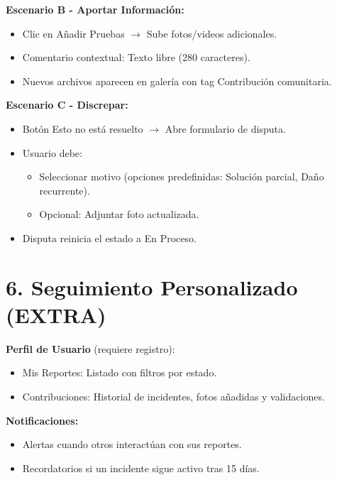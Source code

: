 \begin{multicols}{2}
\textbf{Escenario B - Aportar Información:}
\begin{itemize}
    \item Clic en Añadir Pruebas $\rightarrow$ Sube fotos/videos adicionales.
    \item Comentario contextual: Texto libre (280 caracteres).
    \item Nuevos archivos aparecen en galería con tag Contribución comunitaria.
\end{itemize}

\textbf{Escenario C - Discrepar:}
\begin{itemize}
    \item Botón Esto no está resuelto $\rightarrow$ Abre formulario de disputa.
    \item Usuario debe:
    \begin{itemize}
        \item Seleccionar motivo (opciones predefinidas: Solución parcial, Daño recurrente).
        \item Opcional: Adjuntar foto actualizada.
    \end{itemize}
    \item Disputa reinicia el estado a En Proceso.
\end{itemize}

\section*{6. Seguimiento Personalizado (EXTRA)}

\textbf{Perfil de Usuario} (requiere registro):
\begin{itemize}
    \item Mis Reportes: Listado con filtros por estado.
    \item Contribuciones: Historial de incidentes, fotos añadidas y validaciones.
\end{itemize}

\textbf{Notificaciones:}
\begin{itemize}
    \item Alertas cuando otros interactúan con sus reportes.
    \item Recordatorios si un incidente sigue activo tras 15 días.
\end{itemize}

\end{multicols}